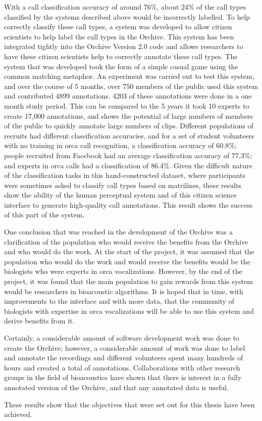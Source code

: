 With a call classification accuracy of around 76\%, about 24\% of the
call types classified by the systems described above would be incorrectly
labelled.  To help correctly classify these call types, a system was
developed to allow citizen scientists to help label the call types in the
Orchive.  This system has been integrated tightly into the Orchive
Version 2.0 code and allows researchers to have these citizen
scientists help to correctly annotate these call types.  The system that
was developed took the form of a simple casual game using the common
matching metaphor.  An experiment was carried out to test this system,
and over the course of 5 months, over 750 members of the public used
this system and contributed 4899 annotations.  4203 of these
annotations were done in a one month study period.  This can be
compared to the 5 years it took 10 experts to create 17,000
annotations, and shows the potential of large numbers of members of
the public to quickly annotate large numbers of clips.  Different
populations of recruits had different classification accuracies, and
for a set of student volunteers with no training in orca call
recognition, a classification accuracy of 60.8\%; people recruited
from Facebook had an average classification accuracy of 77.3\%; and
experts in orca calls had a classification of 86.4\%.  Given the
difficult nature of the classification tasks in this hand-constructed
dataset, where participants were sometimes asked to classify call types
based on matrilines, these results show the ability of the human
perceptual system and of this citizen science interface to generate
high-quality call annotations.  This result shows the success of this
part of the system.

One conclusion that was reached in the development of the Orchive was
a clarification of the population who would receive the benefits from
the Orchive and who would do the work.  At the start of the project,
it was assumed that the population who would do the work and would
receive the benefits would be the biologists who were experts in orca
vocalizations.  However, by the end of the project, it was found that
the main population to gain rewards from this system would be
researchers in bioacoustic algorithms.  It is hoped that in time, with
improvements to the interface and with more data, that the community
of biologists with expertise in orca vocalizations will be able to use
this system and derive benefits from it.

Certainly, a considerable amount of software development work was done
to create the Orchive; however, a considerable amount of work was done
to label and annotate the recordings and \totalExperts different
volunteers spent many hundreds of hours and created a total of
\totalAnnotations annotations.  Collaborations with other research
groups in the field of bioacoustics have shown that there is interest
in a fully annotated version of the Orchive, and that any annotated
data is useful.

These results show that the objectives that were set out for this
thesis have been achieved.
